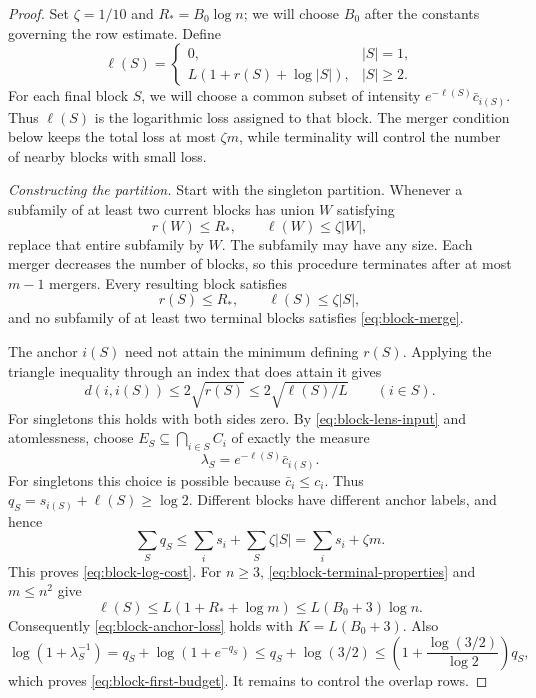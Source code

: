 \begin{proof}
Set $\zeta=1/10$ and $R_*=B_0\log n$; we will choose $B_0$ after
the constants governing the row estimate.  Define
\[
 \ell(S)=
 \begin{cases}
 0,&|S|=1,\\
 L(1+r(S)+\log|S|),&|S|\ge2.
 \end{cases}
\]
For each final block $S$, we will choose a common subset of intensity
$e^{-\ell(S)}\bar c_{i(S)}$.  Thus $\ell(S)$ is the logarithmic loss
assigned to that block.  The merger condition below keeps the total loss
at most $\zeta m$, while terminality will control the number of nearby
blocks with small loss.

\emph{Constructing the partition.}
Start with the singleton partition.  Whenever a subfamily of at least two
current blocks has union $W$ satisfying
\begin{equation}\label{eq:block-merge}
 r(W)\le R_*,\qquad \ell(W)\le\zeta|W|,
\end{equation}
replace that entire subfamily by $W$.
The subfamily may have any size.  Each merger decreases the number of
blocks, so this procedure terminates after at most $m-1$ mergers.
Every resulting block satisfies
\begin{equation}\label{eq:block-terminal-properties}
 r(S)\le R_*,\qquad \ell(S)\le\zeta|S|,
\end{equation}
and no subfamily of at least two terminal blocks satisfies
\eqref{eq:block-merge}.

The anchor $i(S)$ need not attain the minimum defining $r(S)$.
Applying the triangle inequality through an index that does attain it gives
\begin{equation}\label{eq:block-anchor-radius}
 d(i,i(S))\le2\sqrt{r(S)}\le2\sqrt{\ell(S)/L}
 \qquad(i\in S).
\end{equation}
For singletons this holds with both sides zero.
By \eqref{eq:block-lens-input} and atomlessness, choose
$E_S\subseteq\bigcap_{i\in S}C_i$ of exactly the measure
\begin{equation}\label{eq:block-chosen-intensity}
 \lambda_S=e^{-\ell(S)}\bar c_{i(S)}.
\end{equation}
For singletons this choice is possible because $\bar c_i\le c_i$.
Thus $q_S=s_{i(S)}+\ell(S)\ge\log2$.
Different blocks have different anchor labels, and hence
\[
 \sum_Sq_S
 \le\sum_i s_i+\sum_S\zeta|S|
 =\sum_i s_i+\zeta m.
\]
This proves \eqref{eq:block-log-cost}.
For $n\ge3$, \eqref{eq:block-terminal-properties} and $m\le n^2$ give
\[
 \ell(S)\le L(1+R_*+\log m)\le L(B_0+3)\log n.
\]
Consequently \eqref{eq:block-anchor-loss} holds with $K=L(B_0+3)$.
Also
\[
 \log(1+\lambda_S^{-1})
 =q_S+\log(1+e^{-q_S})
 \le q_S+\log(3/2)
 \le\left(1+\frac{\log(3/2)}{\log2}\right)q_S,
\]
which proves \eqref{eq:block-first-budget}.
It remains to control the overlap rows.


\end{proof}
